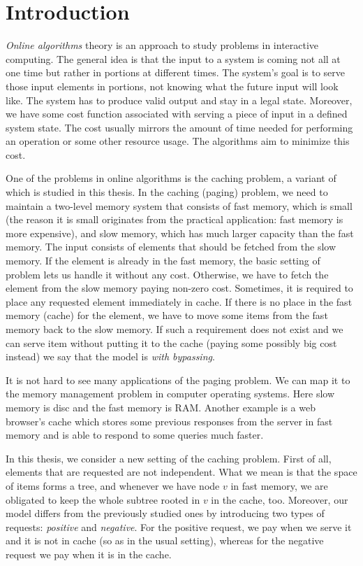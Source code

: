 \section{Introduction}
\textit{Online algorithms} theory is an approach to study problems in 
interactive computing. The general idea is that the input to a system is coming
not all at one time but rather in portions at different times. The system's 
goal is to serve those input elements in portions, not knowing what the 
future input will look like. The system has to produce valid output and stay in 
a legal state. Moreover, we have some cost function associated with serving a piece 
of input in a defined system state. The cost usually mirrors the amount of time 
needed for performing an operation or some other resource usage. The 
algorithms aim to minimize this cost.

One of the problems in online algorithms is the caching problem, a variant of which is 
studied in this thesis. In the caching (paging) problem, we need to maintain a
two-level memory system that consists of fast memory, which is small (the reason 
it is small originates from the practical application: fast memory is more 
expensive), and slow memory, which has much larger capacity than the fast memory. The input consists of elements that should be fetched from the slow memory. If 
the element is already in the fast memory, the basic setting of problem lets us 
handle it without any cost. Otherwise, we have to fetch the element from the slow 
memory paying non-zero cost. Sometimes, it is required to place any requested 
element immediately in cache. If there is no place in the fast memory (cache) for 
the element, we have to move some items from the fast memory back to the slow memory. 
If such a requirement does not exist and we can serve item without putting it to 
the cache (paying some possibly big cost instead) we say that the model is 
\textit{with bypassing}.

It is not hard to see many applications of the paging problem. We can map it to 
the memory management problem in computer operating systems. Here slow memory 
is disc and the fast memory is RAM. Another example is a web browser's cache which 
stores some previous responses from the server in fast memory and is able to 
respond to some queries much faster.

In this thesis, we consider a new setting of the caching problem. First of all, 
elements that are requested are not independent. What we mean is that the 
space of items forms a tree, and whenever we have node $v$ in fast memory, we 
are obligated to keep the whole subtree rooted in $v$ in the cache, too. Moreover,
our model differs from the previously studied ones by introducing two types of 
requests: \textit{positive} and \textit{negative}. For the positive request, we 
pay when we serve it and it is not in cache (so as in the usual setting), whereas 
for the negative request we pay when it is in the cache.

